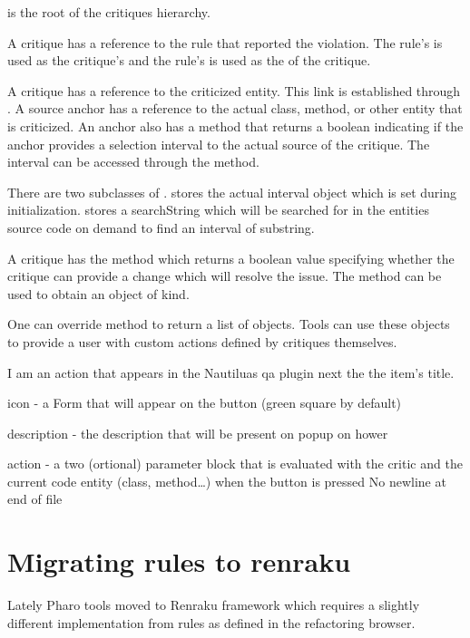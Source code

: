 \documentclass[10pt,twoside,english]{_support/latex/sbabook/sbabook}
\begin{document}
 is the root of the critiques hierarchy.

A critique has a reference to the rule that reported the violation.
The rule's  is used as the critique’s  and the rule's  is used as the  of the critique.

A critique has a reference to the criticized entity. This link is established through . A source anchor has a reference to the actual class, method, or other entity that is criticized. An anchor also has a  method that returns a boolean indicating if the anchor provides a selection interval to the actual source of the critique. The interval can be accessed through the  method.

There are two subclasses of . stores the actual interval object which is set during initialization. stores a searchString which will be searched for in the entities source code on demand to find an interval of substring.

A critique has the  method which returns a boolean value specifying whether the critique can provide a change which will resolve the issue.
The  method can be used to obtain an object of  kind.

One can override  method to return a list of  objects. Tools can use these objects to provide a user with custom actions defined by critiques themselves.

I am an action that appears in the Nautiluas qa plugin next the the item's title.

icon - a Form that will appear on the button (green square by default)

description - the description that will be present on popup on hower

action - a two (ortional) parameter block that is evaluated with the critic and the current code entity (class, method…) when the button is pressed
No newline at end of file

\section{Migrating rules to renraku}
Lately Pharo tools moved to Renraku framework which requires a slightly different implementation from rules as defined in the refactoring browser.
\end{document}
